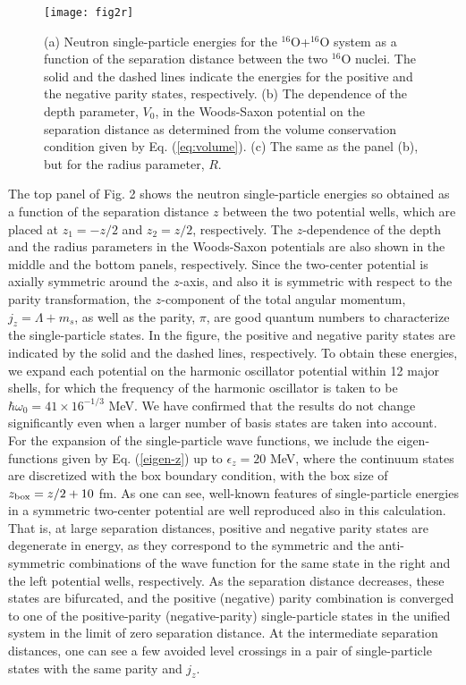 \documentclass[superscriptaddress,twocolumn,amsmath,amssymb]{revtex4}
\begin{document}
\begin{figure}[tb]
\texttt{[image: fig2r]}
\caption{(a) Neutron single-particle energies for the $^{16}$O+$^{16}$O 
system as a function of the separation distance between the two 
$^{16}$O nuclei. 
The solid and the dashed lines indicate the energies for the 
positive and the negative parity states, respectively. 
(b) The dependence of the depth parameter, $V_0$, in the Woods-Saxon potential on the 
separation distance as determined from the volume conservation condition 
given by Eq. (\ref{eq:volume}). 
(c) The same as the panel (b), but for the radius parameter, $R$. 
}
\end{figure}

The top panel of 
Fig. 2 shows the neutron single-particle energies so obtained 
as a function of 
the separation distance $z$ between the two potential wells, which are placed 
at $z_1=-z/2$ and $z_2=z/2$, respectively. 
The $z$-dependence of the depth and the radius parameters in 
the Woods-Saxon potentials are also shown in the middle and the bottom 
panels, respectively.
Since the two-center potential is axially symmetric around the $z$-axis, 
and also it is symmetric with respect to the parity transformation, the 
$z$-component of the total angular momentum, $j_z=\Lambda+m_s$, as well 
as the parity, $\pi$, 
are good quantum numbers to characterize the single-particle 
states. 
In the figure, the positive and negative parity states are indicated by the solid and 
the dashed lines, respectively. 
To obtain these energies, we expand each potential on the harmonic oscillator 
potential within 12 major shells, for which the frequency of the harmonic 
oscillator is taken to be $\hbar\omega_0=41\times 16^{-1/3}$ MeV. 
We have confirmed that the results do not change significantly even when 
a larger number of basis states are taken into account.
For the expansion of the single-particle wave functions, we include 
the eigen-functions given by Eq. (\ref{eigen-z}) up to $\epsilon_z=20$ MeV, 
where the continuum states are discretized with the box boundary 
condition, with the box size of $z_{\rm box}=z/2+10$ fm. 
As one can see, well-known features of single-particle energies in a 
symmetric two-center potential \cite{ZM76,MR86,GGR77} 
are well reproduced also in this calculation. 
That is, at large separation distances, positive and negative parity states 
are degenerate in energy, as they correspond to the symmetric 
and the anti-symmetric combinations of the wave function for the 
same state in the 
right and the left potential wells, respectively. As the separation distance 
decreases, these states are bifurcated, and 
the positive (negative) 
parity combination 
is converged to one of the positive-parity (negative-parity) 
single-particle states in the 
unified system in the limit of zero separation distance. 
At the intermediate separation distances, one can see a few avoided 
level crossings in a pair of single-particle states with the same parity and $j_z$.  
\end{document}
